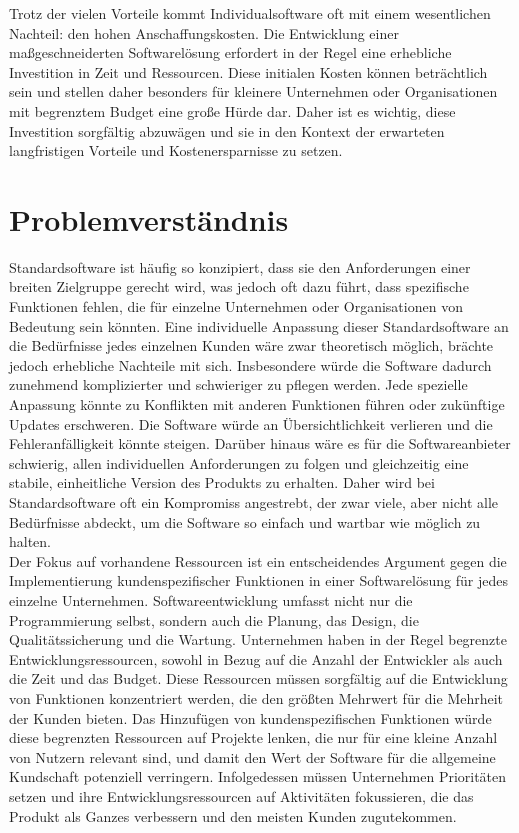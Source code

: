 Trotz der vielen Vorteile kommt Individualsoftware oft mit einem wesentlichen Nachteil: 
den hohen Anschaffungskosten. Die Entwicklung einer maßgeschneiderten Softwarelösung 
erfordert in der Regel eine erhebliche Investition in Zeit und Ressourcen. 
Diese initialen Kosten können beträchtlich sein und stellen daher besonders für 
kleinere Unternehmen oder Organisationen mit begrenztem Budget eine große Hürde dar. 
Daher ist es wichtig, diese Investition sorgfältig abzuwägen und sie in den Kontext der 
erwarteten langfristigen Vorteile und Kostenersparnisse zu setzen.

\newpage
\section{Problemverständnis}

Standardsoftware ist häufig so konzipiert, dass sie den Anforderungen einer breiten 
Zielgruppe gerecht wird, was jedoch oft dazu führt, dass spezifische Funktionen fehlen, 
die für einzelne Unternehmen oder Organisationen von Bedeutung sein könnten. 
Eine individuelle Anpassung dieser Standardsoftware an die Bedürfnisse jedes einzelnen 
Kunden wäre zwar theoretisch möglich, brächte jedoch erhebliche Nachteile mit sich. 
Insbesondere würde die Software dadurch zunehmend komplizierter und 
schwieriger zu pflegen werden. Jede spezielle Anpassung könnte zu Konflikten mit 
anderen Funktionen führen oder zukünftige Updates erschweren. Die Software würde an 
Übersichtlichkeit verlieren und die Fehleranfälligkeit könnte steigen. 
Darüber hinaus wäre es für die Softwareanbieter schwierig, allen individuellen 
Anforderungen zu folgen und gleichzeitig eine stabile, einheitliche 
Version des Produkts zu erhalten. Daher wird bei Standardsoftware oft ein Kompromiss 
angestrebt, der zwar viele, aber nicht alle Bedürfnisse abdeckt, um die Software so 
einfach und wartbar wie möglich zu halten.\\

Der Fokus auf vorhandene Ressourcen ist ein entscheidendes Argument gegen die Implementierung 
kundenspezifischer Funktionen in einer Softwarelösung für jedes einzelne Unternehmen. 
Softwareentwicklung umfasst nicht nur die Programmierung selbst, sondern auch die Planung, 
das Design, die Qualitätssicherung und die Wartung. Unternehmen haben in der Regel begrenzte 
Entwicklungsressourcen, sowohl in Bezug auf die Anzahl der Entwickler als auch die Zeit und 
das Budget. Diese Ressourcen müssen sorgfältig auf die Entwicklung von Funktionen konzentriert 
werden, die den größten Mehrwert für die Mehrheit der Kunden bieten. Das Hinzufügen von 
kundenspezifischen Funktionen würde diese begrenzten Ressourcen auf Projekte lenken, 
die nur für eine kleine Anzahl von Nutzern relevant sind, und damit den Wert der Software 
für die allgemeine Kundschaft potenziell verringern. Infolgedessen müssen Unternehmen 
Prioritäten setzen und ihre Entwicklungsressourcen auf Aktivitäten fokussieren, 
die das Produkt als Ganzes verbessern und den meisten Kunden zugutekommen.

